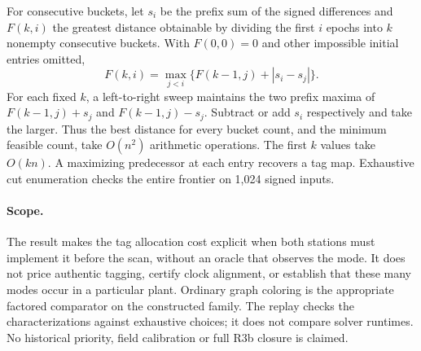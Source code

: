 \documentclass{article}
\begin{document}
For consecutive buckets, let $s_i$ be the prefix sum of the signed
differences and $F(k,i)$ the greatest distance obtainable by dividing
the first $i$ epochs into $k$ nonempty consecutive buckets. With
$F(0,0)=0$ and other impossible initial entries omitted,
\[
 F(k,i)=\max_{j<i}\{ F(k-1,j)+|s_i-s_j|\}.
\]
For each fixed $k$, a left-to-right sweep maintains the two prefix
maxima of $F(k-1,j)+s_j$ and $F(k-1,j)-s_j$. Subtract or add
$s_i$ respectively and take the larger. Thus the best distance
for every bucket count, and the minimum feasible count, take
$O(n^2)$ arithmetic operations. The first $k$ values take $O(kn)$.
A maximizing predecessor at each entry recovers a tag map. Exhaustive
cut enumeration checks the entire frontier on 1,024 signed inputs.

\paragraph{Scope.}
The result makes the tag allocation cost explicit when both stations
must implement it before the scan, without an oracle that observes the
mode. It does not price authentic tagging, certify clock alignment,
or establish that these many modes occur in a particular plant.
Ordinary graph coloring is the appropriate factored comparator on
the constructed family. The replay checks the characterizations
against exhaustive choices; it does not compare solver runtimes.
No historical priority, field calibration or full R3b closure is claimed.
\end{document}
